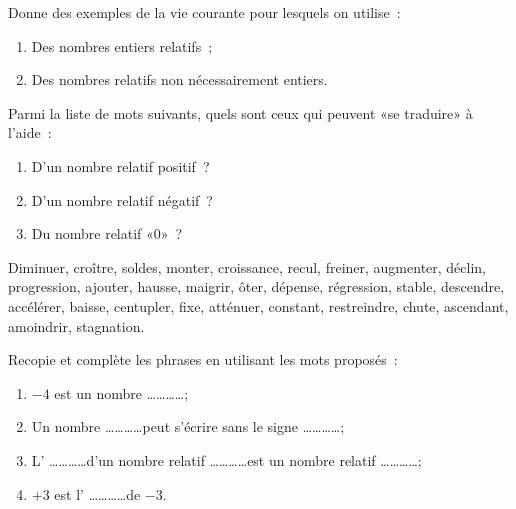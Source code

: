 

\begin{exercice}
Donne des exemples de la vie courante pour lesquels on utilise :
\begin{enumerate}
 \item Des nombres entiers relatifs ;
 \item Des nombres relatifs non nécessairement entiers.
 \end{enumerate}
\end{exercice}


\begin{exercice}[Interprétation]
Parmi la liste de mots suivants, quels sont ceux qui peuvent «se traduire» à l'aide : 
\begin{enumerate}
 \item D'un nombre relatif positif ?
 \item D'un nombre relatif négatif ?
 \item Du nombre relatif «0» ?
 \end{enumerate}
 
Diminuer, croître, soldes, monter, croissance, recul, freiner, augmenter, déclin, progression, ajouter, hausse, maigrir, ôter, dépense, régression, stable, descendre, accélérer, baisse, centupler, fixe, atténuer, constant, restreindre, chute, ascendant, amoindrir, stagnation.
\end{exercice}


\begin{exercice}
Recopie et complète les phrases en utilisant les mots proposés :

 \quad {} \quad {} \quad {} \quad {}

\begin{enumerate}
 \item $-4$ est un nombre \ldots \ldots \ldots \ldots ;
 \item Un nombre \ldots \ldots \ldots \ldots peut s'écrire sans le signe \ldots \ldots \ldots \ldots ;
 \item L' \ldots \ldots \ldots \ldots d'un nombre relatif \ldots \ldots \ldots \ldots est un nombre relatif \ldots \ldots \ldots \ldots ;
 \item $+3$ est l' \ldots \ldots \ldots \ldots de $-3$.
 \end{enumerate}
\end{exercice}


